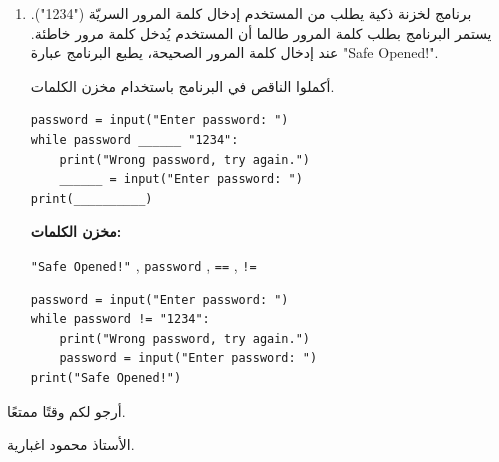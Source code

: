 \documentclass[14pt]{extarticle}
\begin{document}
\begin{enumerate}[itemsep=3em]
\textbf{مخزن الكلمات:}
\begin{center}
\begin{english}
\begin{boxCode}
\texttt{price} \quad , \quad \texttt{0} \quad , \quad \texttt{total} \quad , \quad \texttt{0}
\end{boxCode}
\end{english}
\end{center}

\ifwithsols
\begin{boxSolution}
\begin{english}
\begin{verbatim}
total = 0
price = int(input("Enter price (0 to stop): "))
while price != 0:
    total = total + price
    price = int(input("Enter price (0 to stop): "))
print("Total to pay is: ", total)
\end{verbatim}
\end{english}
\end{boxSolution}
\fi


\item برنامج لخزنة ذكية يطلب من المستخدم إدخال كلمة المرور السريّة (\textenglish{"1234"}). يستمر البرنامج بطلب كلمة المرور طالما أن المستخدم يُدخل كلمة مرور خاطئة. عند إدخال كلمة المرور الصحيحة، يطبع البرنامج عبارة \textenglish{"Safe Opened!"}.

أكملوا الناقص في البرنامج باستخدام مخزن الكلمات.

\begin{boxCode}
\begin{english}
\begin{verbatim}
password = input("Enter password: ")
while password ______ "1234":
    print("Wrong password, try again.")
    ______ = input("Enter password: ")
print(__________)
\end{verbatim}
\end{english}
\end{boxCode}

\textbf{مخزن الكلمات:}
\begin{center}
\begin{english}
\begin{boxCode}
\texttt{"Safe Opened!"} \quad , \quad \texttt{password} \quad , \quad \texttt{==} \quad , \quad \texttt{!=}
\end{boxCode}
\end{english}
\end{center}

\ifwithsols
\begin{boxSolution}
\begin{english}
\begin{verbatim}
password = input("Enter password: ")
while password != "1234":
    print("Wrong password, try again.")
    password = input("Enter password: ")
print("Safe Opened!")
\end{verbatim}
\end{english}
\end{boxSolution}
\fi

\end{enumerate}

\vspace{1cm}
\begin{flushleft}
أرجو لكم وقتًا ممتعًا.

الأستاذ محمود اغبارية.
\end{flushleft}
\end{document}

